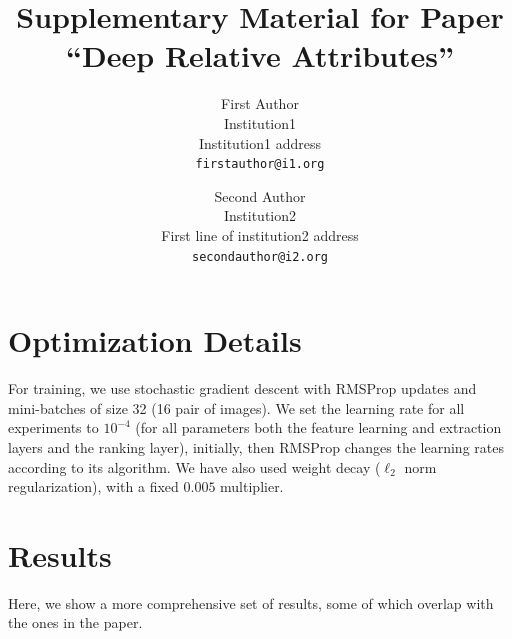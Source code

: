 \documentclass[10pt,twocolumn,letterpaper]{article}
\begin{document}
\title{Supplementary Material for Paper\\``Deep Relative Attributes''}

\author{First Author\\
Institution1\\
Institution1 address\\
{\tt\small firstauthor@i1.org}
\and
Second Author\\
Institution2\\
First line of institution2 address\\
{\tt\small secondauthor@i2.org}
}

\maketitle


\section{Optimization Details}
For training, we use stochastic gradient descent with RMSProp \cite{Tieleman2012} updates and mini-batches of size 32 (16 pair of images). We set the learning rate for all experiments to $10^{-4}$ (for all parameters both the feature learning and extraction layers and the ranking layer), initially, then RMSProp changes the learning rates according to its algorithm. We have also used weight decay ($\ell_2$ norm regularization), with a fixed $0.005$ multiplier.

\section{Results}
Here, we show a more comprehensive set of results, some of which overlap with the ones in the paper.
\end{document}
